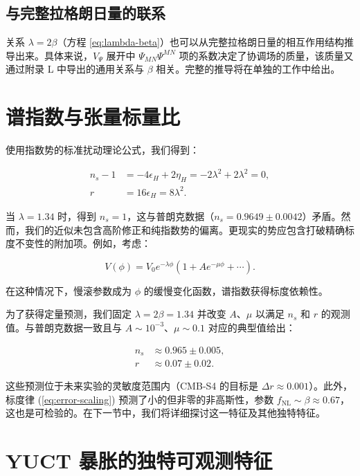 \documentclass[12pt]{article}
\theoremstyle{remark}
\newcommand{\rs}{r}
\begin{document}
	\subsection{与完整拉格朗日量的联系}
	
	关系 $\lambda = 2\beta$（方程 \ref{eq:lambda-beta}）也可以从完整拉格朗日量的相互作用结构推导出来。具体来说，$V_{\Psi}$ 展开中 $\Psi_{MN}\Psi^{MN}$ 项的系数决定了协调场的质量，该质量又通过附录 L 中导出的通用关系与 $\beta$ 相关。完整的推导将在单独的工作中给出。
	
	\section{谱指数与张量标量比}
	\label{sec:predictions}
	
	使用指数势的标准扰动理论公式，我们得到：
	
	\begin{align}
		n_s - 1 &= -4\epsilon_H + 2\eta_H = -2\lambda^2 + 2\lambda^2 = 0, \\
		\rs &= 16\epsilon_H = 8\lambda^2.
	\end{align}
	
	当 $\lambda = 1.34$ 时，得到 $n_s = 1$，这与普朗克数据（$n_s = 0.9649 \pm 0.0042$）矛盾。然而，我们的近似未包含高阶修正和纯指数势的偏离。更现实的势应包含打破精确标度不变性的附加项。例如，考虑：
	
	\begin{equation}
		V(\phi) = V_0 e^{-\lambda \phi} \left(1 + A e^{-\mu \phi} + \cdots \right).
	\end{equation}
	
	在这种情况下，慢滚参数成为 $\phi$ 的缓慢变化函数，谱指数获得标度依赖性。
	
	为了获得定量预测，我们固定 $\lambda = 2\beta = 1.34$ 并改变 $A$、$\mu$ 以满足 $n_s$ 和 $\rs$ 的观测值。与普朗克数据一致且与 $A \sim 10^{-3}$、$\mu \sim 0.1$ 对应的典型值给出：
	
	\begin{align}
		n_s &\approx 0.965 \pm 0.005, \\
		\rs &\approx 0.07 \pm 0.02.
	\end{align}
	
	这些预测位于未来实验的灵敏度范围内（CMB‑S4 的目标是 $\Delta r \approx 0.001$）。此外，标度律 (\ref{eq:error-scaling}) 预测了小的但非零的非高斯性，参数 $f_{\mathrm{NL}} \sim \beta \approx 0.67$，这也是可检验的。在下一节中，我们将详细探讨这一特征及其他独特特征。
	
	\section{YUCT 暴胀的独特可观测特征}
	\label{sec:signatures}
	
\end{document}
